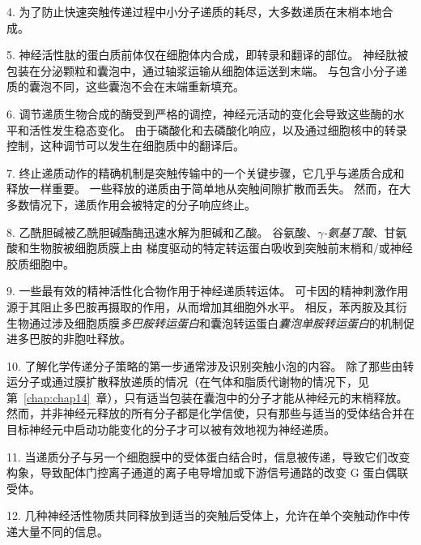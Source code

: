 4. 为了防止快速突触传递过程中小分子递质的耗尽，大多数递质在末梢本地合成。


5. 神经活性肽的蛋白质前体仅在细胞体内合成，即转录和翻译的部位。
神经肽被包装在分泌颗粒和囊泡中，通过轴浆运输从细胞体运送到末端。
与包含小分子递质的囊泡不同，这些囊泡不会在末端重新填充。 


6. 调节递质生物合成的酶受到严格的调控，神经元活动的变化会导致这些酶的水平和活性发生稳态变化。
由于磷酸化和去磷酸化响应，以及通过细胞核中的转录控制，这种调节可以发生在细胞质中的翻译后。 


7. 终止递质动作的精确机制是突触传输中的一个关键步骤，它几乎与递质合成和释放一样重要。
一些释放的递质由于简单地从突触间隙扩散而丢失。
然而，在大多数情况下，递质作用会被特定的分子响应终止。 


8. 乙酰胆碱被乙酰胆碱酯酶迅速水解为胆碱和乙酸。
谷氨酸、\textit{$\gamma$-氨基丁酸}、甘氨酸和生物胺被细胞质膜上由  梯度驱动的特定转运蛋白吸收到突触前末梢和/或神经胶质细胞中。


9. 一些最有效的精神活性化合物作用于神经递质转运体。
可卡因的精神刺激作用源于其阻止多巴胺再摄取的作用，从而增加其细胞外水平。
相反，苯丙胺及其衍生物通过涉及细胞质膜\textit{多巴胺转运蛋白}和囊泡转运蛋白\textit{囊泡单胺转运蛋白}的机制促进多巴胺的非胞吐释放。


10. 了解化学传递分子策略的第一步通常涉及识别突触小泡的内容。
除了那些由转运分子或通过膜扩散释放递质的情况（在气体和脂质代谢物的情况下，见第~\ref{chap:chap14}~章），只有适当包装在囊泡中的分子才能从神经元的末梢释放。
然而，并非神经元释放的所有分子都是化学信使，只有那些与适当的受体结合并在目标神经元中启动功能变化的分子才可以被有效地视为神经递质。 


11. 当递质分子与另一个细胞膜中的受体蛋白结合时，信息被传递，导致它们改变构象，导致配体门控离子通道的离子电导增加或下游信号通路的改变 G 蛋白偶联受体。 


12. 几种神经活性物质共同释放到适当的突触后受体上，允许在单个突触动作中传递大量不同的信息。


